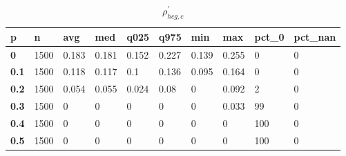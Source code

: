 \begin{table}[h]
 \centering 
\footnotesize
\caption{$\rho_{hcg,c}^\prime $}
\label{tab:alphahcgc}
\begin{tabular}[h]{|l|l|l|l|l|l|l|l|l|l|
    } \hline
\textbf{ p} & \textbf{ n} & \textbf{ avg} & \textbf{ med} & \textbf{ q025} & \textbf{ q975} & \textbf{ min} & \textbf{ max} & \textbf{ pct\_0} & \textbf{ pct\_nan}
    \\ \hline
  \textbf{  0} & 1500 & 0.183 & 0.181 & 0.152 & 0.227 & 0.139 & 0.255 &   0 & 0
    \\ \hline
  \textbf{0.1} & 1500 & 0.118 & 0.117 &   0.1 & 0.136 & 0.095 & 0.164 &   0 & 0
    \\ \hline
  \textbf{0.2} & 1500 & 0.054 & 0.055 & 0.024 &  0.08 &     0 & 0.092 &   2 & 0
    \\ \hline
  \textbf{0.3} & 1500 &     0 &     0 &     0 &     0 &     0 & 0.033 &  99 & 0
    \\ \hline
  \textbf{0.4} & 1500 &     0 &     0 &     0 &     0 &     0 &     0 & 100 & 0
    \\ \hline
  \textbf{0.5} & 1500 &     0 &     0 &     0 &     0 &     0 &     0 & 100 & 0
    \\ \hline
 \end{tabular}
 \end{table}

